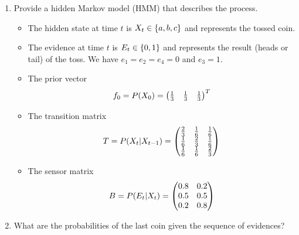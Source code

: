 \documentclass[11pt, a4paper]{article}
\begin{document}
\begin{enumerate}
    \item Provide a hidden Markov model (HMM) that describes the process.

    \begin{solution}
        \begin{itemize}
            \item The hidden state at time $t$ is $X_t \in \{a, b, c\}$ and represents the tossed coin.

            \item The evidence at time $t$ is $E_t \in \{0, 1\}$ and represents the result (heads or tail) of the toss. We have $e_1 = e_2 = e_4 = 0$ and $e_3 = 1$.

            \item The prior vector
                \begin{equation*}
                    f_0 = P(X_0) = \begin{pmatrix}\frac{1}{3} & \frac{1}{3} & \frac{1}{3}\end{pmatrix}^T
                \end{equation*}

            \item The transition matrix
                \begin{equation*}
                    T = P(X_t | X_{t-1}) = \begin{pmatrix}
                        \frac{2}{3} & \frac{1}{6} & \frac{1}{6} \\
                        \frac{1}{6} & \frac{2}{3} & \frac{1}{6} \\
                        \frac{1}{6} & \frac{1}{6} & \frac{2}{3}
                    \end{pmatrix}
                \end{equation*}

            \item The sensor matrix
                \begin{equation*}
                    B = P(E_t | X_t) = \begin{pmatrix}
                        0.8 & 0.2 \\
                        0.5 & 0.5 \\
                        0.2 & 0.8
                    \end{pmatrix}
                \end{equation*}
        \end{itemize}
    \end{solution}

    \item What are the probabilities of the last coin given the sequence of evidences?


\end{enumerate}
\end{document}
